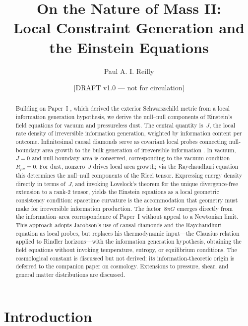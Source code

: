 \documentclass[12pt]{article}
\title{On the Nature of Mass II:\\
Local Constraint Generation and the Einstein Equations}
\author{Paul A. I. Reilly}
\date{[DRAFT v1.0 --- not for circulation]}
\begin{document}
\maketitle

\begin{abstract}

Building on Paper~I \cite{Reilly2026}, which derived the exterior
Schwarzschild metric from a local information generation hypothesis,
we derive the null--null components of Einstein's field equations
for vacuum and pressureless dust.
The central quantity is~$J$, the local rate density of irreversible
information generation, weighted by information content per outcome.
Infinitesimal causal diamonds serve as covariant local probes
connecting null-boundary area growth to the bulk generation of
irreversible information \cite{Jacobson1995,Wald1984}.
In vacuum, $J=0$ and null-boundary area is conserved,
corresponding to the vacuum condition $R_{\mu\nu}=0$.
For dust, nonzero~$J$ drives local area growth; via the
Raychaudhuri equation this determines the null--null components
of the Ricci tensor.
Expressing energy density directly in terms of~$J$,
and invoking Lovelock's theorem \cite{Lovelock1971} for the
unique divergence-free extension to a rank-2 tensor, yields
the Einstein equations as a local geometric consistency
condition: spacetime curvature is the accommodation that
geometry must make for irreversible information production.
The factor~$8\pi G$ emerges directly from the information--area
correspondence of Paper~I without appeal to a Newtonian limit.
This approach adopts Jacobson's \cite{Jacobson1995} use of
causal diamonds and the Raychaudhuri equation as local probes,
but replaces his thermodynamic input---the Clausius relation
applied to Rindler horizons---with the information generation
hypothesis, obtaining the field equations without invoking
temperature, entropy, or equilibrium conditions.
The cosmological constant is discussed but not derived;
its information-theoretic origin is deferred to the
companion paper on cosmology.
Extensions to pressure, shear, and general matter distributions
are discussed.

\end{abstract}

\section{Introduction}
\end{document}
